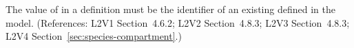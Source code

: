 The value of  in a \Species definition must be the
identifier of an existing \Compartment defined in the model.  (References:
L2V1 Section~4.6.2; L2V2 Section~4.8.3; L2V3 Section~4.8.3; L2V4 Section~\ref{sec:species-compartment}.)
